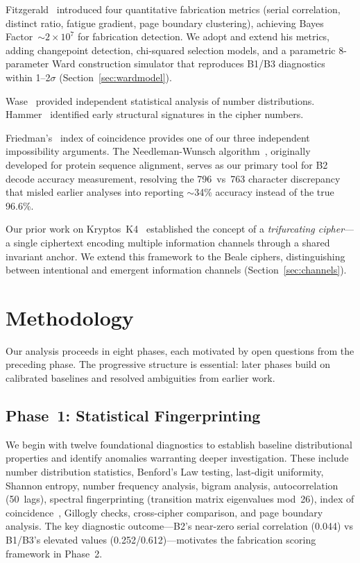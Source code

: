 \documentclass[11pt,a4paper]{article}
\begin{document}
Fitzgerald~\cite{fitzgerald2024} introduced four quantitative fabrication
metrics (serial correlation, distinct ratio, fatigue gradient, page
boundary clustering), achieving Bayes Factor~$\sim 2 \times 10^7$ for
fabrication detection. We adopt and extend his metrics, adding changepoint
detection, chi-squared selection models, and a parametric 8-parameter
Ward construction simulator that reproduces B1/B3 diagnostics within
1--2$\sigma$ (Section~\ref{sec:wardmodel}).

Wase~\cite{wase2020} provided independent statistical analysis of number
distributions. Hammer~\cite{hammer1968} identified early structural
signatures in the cipher numbers.

Friedman's~\cite{friedman1987} index of coincidence provides one of our
three independent impossibility arguments. The Needleman-Wunsch
algorithm~\cite{needleman1970}, originally developed for protein sequence
alignment, serves as our primary tool for B2 decode accuracy measurement,
resolving the 796~vs~763 character discrepancy that misled earlier analyses
into reporting $\sim$34\% accuracy instead of the true 96.6\%.

Our prior work on Kryptos~K4~\cite{daugherty2026k4} established the
concept of a \emph{trifurcating cipher}---a single ciphertext encoding
multiple information channels through a shared invariant anchor. We extend
this framework to the Beale ciphers, distinguishing between intentional
and emergent information channels (Section~\ref{sec:channels}).

\section{Methodology}
\label{sec:methodology}

Our analysis proceeds in eight phases, each motivated by open questions
from the preceding phase. The progressive structure is essential:
later phases build on calibrated baselines and resolved ambiguities
from earlier work.

\subsection{Phase~1: Statistical Fingerprinting}

We begin with twelve foundational diagnostics to establish baseline
distributional properties and identify anomalies warranting deeper
investigation. These include number distribution statistics,
Benford's Law testing, last-digit uniformity, Shannon entropy,
number frequency analysis, bigram analysis, autocorrelation
(50~lags), spectral fingerprinting (transition matrix eigenvalues
mod~26), index of coincidence~\cite{friedman1987}, Gillogly checks,
cross-cipher comparison, and page boundary analysis. The key
diagnostic outcome---B2's near-zero serial correlation (0.044) vs
B1/B3's elevated values (0.252/0.612)---motivates the fabrication
scoring framework in Phase~2.
\end{document}
